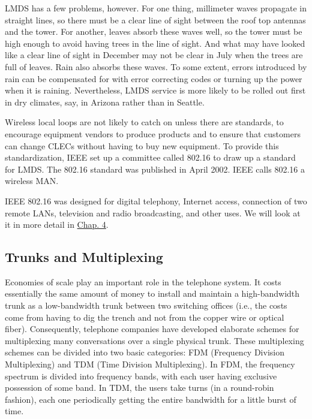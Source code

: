 \documentclass[b5paper,11pt]{memoir}
\begin{document}
LMDS has a few problems, however. For one thing, millimeter waves
propagate in straight lines, so there must be a clear line of sight
between the roof top antennas and the tower. For another, leaves absorb
these waves well, so the tower must be high enough to avoid having trees
in the line of sight. And what may have looked like a clear line of
sight in December may not be clear in July when the trees are full of
leaves. Rain also absorbs these waves. To some extent, errors introduced
by rain can be compensated for with error correcting codes or turning up
the power when it is raining. Nevertheless, LMDS service is more likely
to be rolled out first in dry climates, say, in Arizona rather than in
Seattle.

Wireless local loops are not likely to catch on unless there are
standards, to encourage equipment vendors to produce products and to
ensure that customers can change CLECs without having to buy new
equipment. To provide this standardization, IEEE set up a committee
called 802.16 to draw up a standard for LMDS. The 802.16 standard was
published in April 2002. IEEE calls 802.16 a {wireless MAN}.

IEEE 802.16 was designed for digital telephony, Internet access,
connection of two remote LANs, television and radio broadcasting, and
other uses. We will look at it in more detail in
\protect\hyperlink{0130661023_ch04.htmlux5cux23ch04}{Chap. 4}.

\protect\hypertarget{0130661023_ch02lev1sec5.htmlux5cux23ch02lev2sec20}{}{}

\subsection{Trunks and Multiplexing}

Economies of scale play an important role in the telephone system. It
costs essentially the same amount of money to install and maintain a
high-bandwidth trunk as a low-bandwidth trunk between two switching
offices (i.e., the costs come from having to dig the trench and not from
the copper wire or optical fiber). Consequently, telephone companies
have developed elaborate schemes for multiplexing many conversations
over a single physical trunk. These multiplexing schemes can be divided
into two basic categories: {FDM} ({Frequency Division Multiplexing}) and
{TDM} ({Time Division Multiplexing}). In FDM, the frequency spectrum is
divided into frequency bands, with each user having exclusive possession
of some band. In TDM, the users take turns (in a round-robin fashion),
each one periodically getting the entire bandwidth for a little burst of
time.
\end{document}
